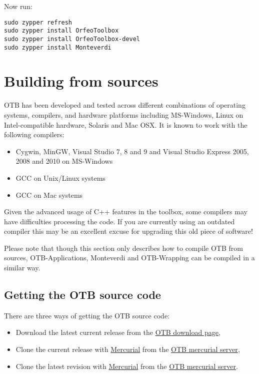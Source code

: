 Now run:
\begin{verbatim}
sudo zypper refresh
sudo zypper install OrfeoToolbox
sudo zypper install OrfeoToolbox-devel
sudo zypper install Monteverdi
\end{verbatim}

\section{Building from sources}
\label{sec:source}
OTB has been developed and tested across different combinations of
operating systems, compilers, and hardware platforms including
MS-Windows, Linux on Intel-compatible hardware, Solaris and Mac
OSX.  It is known to work with the following compilers:
\begin{itemize}
\item Cygwin, MinGW, Visual Studio 7, 8 and 9 and Visual Studio Express 2005, 
  2008 and 2010 on MS-Windows%
\item GCC on Unix/Linux systems
\item GCC on Mac systems
\end{itemize}

Given the advanced usage of C++ features in the toolbox, some
compilers may have difficulties processing the code. If you are
currently using an outdated compiler this may be an excellent excuse
for upgrading this old piece of software!

Please note that though this section only describes how to compile OTB from sources,
OTB-Applications, Monteverdi and OTB-Wrapping can be compiled in a similar way.

\subsection{Getting the OTB source code}

There are three ways of getting the OTB source code:
\begin{itemize}
\item Download the latest current release from the \href{http://sourceforge.net/projects/orfeo-toolbox/}{OTB download page},
\item Clone the current release with \href{http://mercurial.selenic.com}{Mercurial} from the \href{http://hg.orfeo-toolbox.org/OTB}{OTB mercurial server},
\item Clone the latest revision with \href{http://mercurial.selenic.com}{Mercurial} from the \href{http://hg.orfeo-toolbox.org/OTB}{OTB mercurial server}.
\end{itemize}

